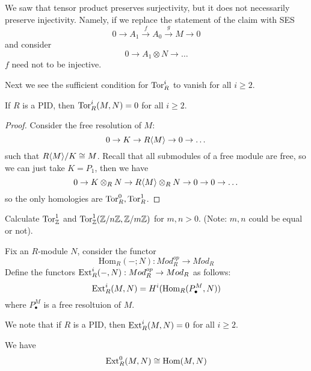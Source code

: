 \begin{warn}
    We saw that tensor product preserves surjectivity, but it does not necessarily preserve injectivity. Namely, if we replace the statement of the claim with SES 
    \begin{equation*}
        0\to A_1\xrightarrow{f}A_0\xrightarrow{g}M\to 0
    \end{equation*}
    and consider 
    \begin{equation*}
        0\to A_1\otimes N\to\dots
    \end{equation*}
    $f$ need not to be injective.
\end{warn}
Next we see the sufficient condition for $\text{Tor}_R^i$ to vanish for all $i\geq 2$.
\begin{cor}
    If $R$ is a PID, then $\text{Tor}_R^i(M,N)=0$ for all $i\geq 2$.
\end{cor}
\begin{proof}
    Consider the free resolution of $M$:
    \begin{equation*}
        0\to K\to R\langle M\rangle\to 0\to\dots
    \end{equation*}
    such that $R\langle M\rangle/K\cong M$.
    Recall that all submodules of a free module are free, so we can just take $K=P_1$, then we have 
    \begin{equation*}
        0\to K\otimes_RN\to R\langle M\rangle\otimes_RN\to 0\to 0\to\dots
    \end{equation*}
    so the only homologies are $\text{Tor}_R^0, \text{Tor}_R^1$.
\end{proof}
\begin{prob}[HW(2.4)]
    Calculate $\text{Tor}_{\mathbb{Z}}^1$ and $\text{Tor}_{\mathbb{Z}}^1(\mathbb{Z}/n\mathbb{Z},\mathbb{Z}/m\mathbb{Z})$ for $m,n>0$. (Note: $m,n$ could be equal or not).
\end{prob}
\begin{defn}
    Fix an $R$-module $N$, consider the functor 
    \begin{equation*}
        \text{Hom}_R(-;N):Mod_R^{op}\to Mod_R
    \end{equation*}
    Define the functors $\text{Ext}_R^i(-,N): Mod_R^{op}\to Mod_R$ as follows:
    \begin{equation*}
        \text{Ext}_R^i(M,N)=H^i(\text{Hom}_R(P_\bullet^M,N))
    \end{equation*}
    where $P_\bullet^M$ is a free resoltuion of $M$. 
\end{defn}
We note that if $R$ is a PID, then $\text{Ext}_R^i(M,N)=0$ for all $i\geq 2$. 
\begin{prop}
    We have 
    \begin{equation*}
        \text{Ext}_R^0(M,N)\cong\text{Hom}(M,N)
    \end{equation*}
\end{prop}
